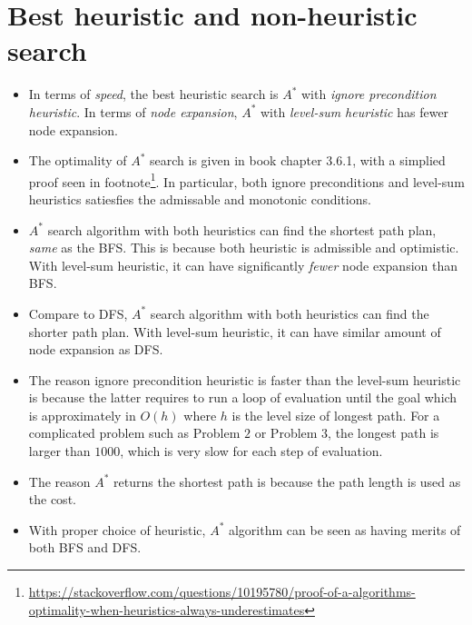 \documentclass[11pt]{article}
\begin{document}
\section{Best heuristic and non-heuristic search}
\begin{itemize}
\item In terms of \emph{speed}, the best heuristic search is $A^*$ with\emph{ ignore precondition heuristic}. In terms of \emph{node expansion},  $A^*$ with \emph{level-sum heuristic} has fewer node expansion. 

\item The optimality of $A^*$ search is given in book \cite{poole2010artificial} chapter 3.6.1, with a simplied proof seen in footnote\footnote{\url{https://stackoverflow.com/questions/10195780/proof-of-a-algorithms-optimality-when-heuristics-always-underestimates}}. In particular, both ignore preconditions and level-sum heuristics satiesfies the admissable and monotonic conditions. 

\item  $A^*$ search algorithm  with both heuristics can find the shortest path plan, \emph{same} as the BFS.  This is because both heuristic is admissible and optimistic. With level-sum heuristic, it can have significantly \emph{fewer} node expansion than BFS. 

\item Compare to DFS, $A^*$ search algorithm  with both heuristics can find the shorter path plan. With level-sum heuristic, it can have similar amount of  node expansion  as DFS. 

\item The reason ignore precondition heuristic is faster than the level-sum heuristic  is because the latter requires to run a loop of evaluation until the goal which is approximately in $O(h)$ where $h$ is the level size of longest path. For a complicated problem such as Problem $2$ or Problem $3$, the longest path is larger than $1000$, which is very slow for each step of evaluation. 

\item The reason $A^*$ returns the shortest path is because the path length is used as the cost. 

\item With proper choice of heuristic, $A^*$ algorithm can be seen as having merits of both BFS and DFS. 
\end{itemize}

\newpage

%

\end{document}
